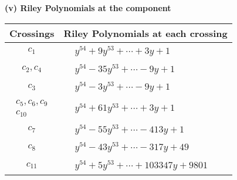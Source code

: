 \documentclass[1p]{elsarticle_modified}
\theoremstyle{definition}
\begin{document}
\flushleft \textbf{(v) Riley Polynomials at the component}\newline \\
\begin{tabular}{m{50pt}|m{274pt}}
Crossings & \hspace{64pt}Riley Polynomials at each crossing \\
\hline $$\begin{aligned}c_{1}\end{aligned}$$&$\begin{aligned}
&y^{54}+9 y^{53}+\cdots+3 y+1
\end{aligned}$\\
\hline $$\begin{aligned}c_{2},c_{4}\end{aligned}$$&$\begin{aligned}
&y^{54}-35 y^{53}+\cdots-9 y+1
\end{aligned}$\\
\hline $$\begin{aligned}c_{3}\end{aligned}$$&$\begin{aligned}
&y^{54}-3 y^{53}+\cdots-9 y+1
\end{aligned}$\\
\hline $$\begin{aligned}c_{5},c_{6},c_{9}\\c_{10}\end{aligned}$$&$\begin{aligned}
&y^{54}+61 y^{53}+\cdots+3 y+1
\end{aligned}$\\
\hline $$\begin{aligned}c_{7}\end{aligned}$$&$\begin{aligned}
&y^{54}-55 y^{53}+\cdots-413 y+1
\end{aligned}$\\
\hline $$\begin{aligned}c_{8}\end{aligned}$$&$\begin{aligned}
&y^{54}-43 y^{53}+\cdots-317 y+49
\end{aligned}$\\
\hline $$\begin{aligned}c_{11}\end{aligned}$$&$\begin{aligned}
&y^{54}+5 y^{53}+\cdots+103347 y+9801
\end{aligned}$\\
\hline
\end{tabular}\\~\\
\end{document}
